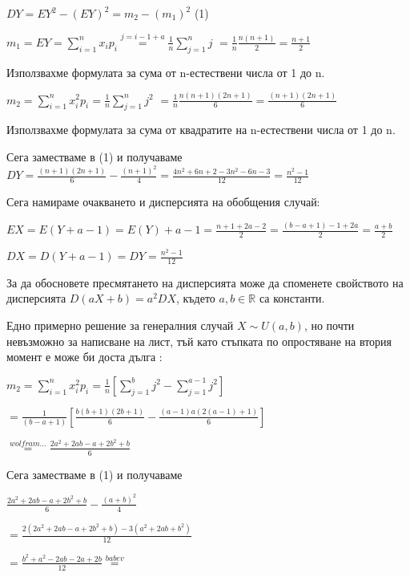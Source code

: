 \documentclass[fleqn,12pt]{article}
\begin{document}
\begin{justify}
\vspace{10pt}
$DY = EY^2 - (EY)^2  = m_2 - (m_1)^2$ \indent (1)

$m_1 = EY = \sum_{i=1}^n x_ip_i \overset{j = i-1+a}{=} \frac{1}{n} \sum_{j=1}^n j$
$ = \frac{1}{n} \frac{n(n+1)}{2} = \frac{n+1}{2}$

Използвахме формулата за сума от n-естествени числа от 1 до n.
\vspace{10pt}

$m_2 = \sum_{i=1}^n x_i^2 p_i = \frac{1}{n} \sum_{j=1}^n j^2 $ 
$ = \frac{1}{n} \frac{n(n+1)(2n+1)}{6} = \frac{(n+1)(2n+1)}{6}$

Използвахме формулата за сума от квадратите на n-естествени числа от 1 до n.

\vspace{10pt}
Сега заместваме в (1) и получаваме 
$DY = \frac{(n+1)(2n+1)}{6} - \frac{(n+1)^2}{4} = \frac{4n^2+6n+2 - 3n^2-6n-3}{12} = \frac{n^2 - 1}{12}$

\vspace{10pt}
Сега намираме очакването и дисперсията на обобщения случай:

$EX = E(Y+a-1) = E(Y) + a - 1 = \frac{n + 1 + 2a - 2}{2} = \frac{(b-a+1) -1 +2a}{2} = \frac{a+b}{2}$

\vspace{10pt}

$DX = D(Y+a-1) = DY = \frac{n^2 - 1}{12}$

За да обосновете  пресмятането на дисперсията може да споменете свойството на дисперсията $D(aX + b) = a^2DX$, 
където $a,b \in \mathbb{R}$ са константи.

\vspace{10pt}
Едно примерно решение за генералния случай $X \sim U(a, b)$, но почти невъзможно за написване на лист, тъй като
стъпката по опростяване на втория момент е може би доста дълга : 

$m_2 = \sum_{i=1}^n x_i^2 p_i = \frac{1}{n} [\sum_{j=1}^b j^2  - \sum_{j=1}^{a-1} j^2 ]$ 

$ = \frac{1}{(b-a+1)} [\frac{b(b+1)(2b+1)}{6} - \frac{(a-1)a(2(a-1)+1)}{6}]$

$\overset{wolfram \dots}{=} \frac{2a^2 + 2ab - a + 2b^2 + b}{6}$

Сега заместваме в (1) и получаваме 

$\frac{2a^2 + 2ab - a + 2b^2 + b}{6} - \frac{(a+b)^2}{4}$

$ = \frac{2(2a^2 + 2ab - a + 2b^2 + b) - 3(a^2 + 2ab + b^2)}{12}$

$ = \frac{b^2 + a^2 -2ab -2a + 2b}{12} \overset{babev}{=} $


\end{justify}
\end{document}
